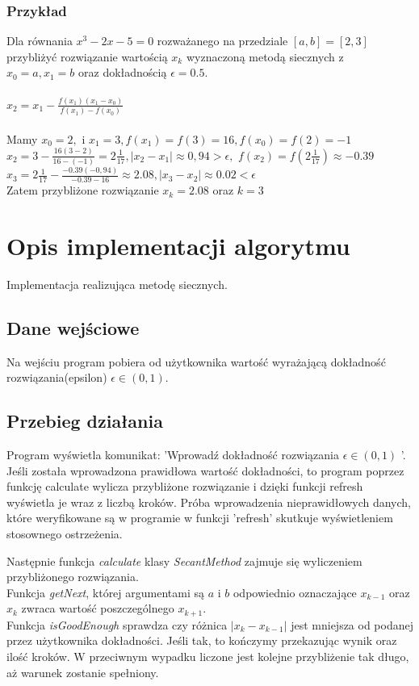 \documentclass[12pt]{article}
\begin{document}
\subsubsection{Przykład}
Dla równania $x^3-2x-5=0$ rozważanego na przedziale $[a,b]=[2,3]$ przybliżyć rozwiązanie wartością $x_k$ wyznaczoną metodą siecznych z\\
$x_0=a, x_1=b$ oraz dokładnością $\epsilon = 0.5.$
\\ \\
$ x_2=x_1 - \frac{f(x_1)(x_1-x_{0})}{f(x_1)-f(x_{0})}$
\\ \\
 Mamy $ x_{0}=2,$ i $x_{1}=3, f(x_1)=f(3)=16, f(x_0)=f(2)=-1$ 
\\$x_2=3-\frac{16(3-2)}{16-(-1)}=2 \frac{1}{17}, |x_2 - x_1|\approx 0,94 > \epsilon,$
$f(x_2)=f(2 \frac{1}{17})\approx-0.39$ $x_3=2 \frac{1}{17}-\frac{-0.39(-0,94)}{-0.39-16}\approx2.08, |x_3 - x_2|\approx 0.02<\epsilon$
\\Zatem przybliżone rozwiązanie $x_k=2.08$ oraz $k=3$
\section{Opis implementacji algorytmu}
Implementacja realizująca metodę siecznych.
\subsection{Dane wejściowe}
Na wejściu program pobiera od użytkownika wartość wyrażającą dokładność rozwiązania(epsilon) $\epsilon \in(0,1).$ 



\subsection{Przebieg działania}
Program wyświetla komunikat: 'Wprowadź dokładność rozwiązania $\epsilon \in(0,1)$ '. Jeśli została wprowadzona prawidłowa wartość dokładności, to program poprzez funkcję calculate wylicza przybliżone rozwiązanie i dzięki funkcji refresh wyświetla je wraz z liczbą kroków.
Próba wprowadzenia nieprawidłowych danych, które weryfikowane są w programie w funkcji 'refresh' skutkuje wyświetleniem stosownego ostrzeżenia.
\par Następnie funkcja \emph{calculate} klasy \emph{SecantMethod} zajmuje się wyliczeniem przybliżonego rozwiązania.\\
Funkcja \emph{getNext}, której argumentami są $a$ i $b$ odpowiednio oznaczające $x_{k-1}$ oraz $x_{k}$ zwraca wartość poszczególnego $x_{k+1}$.
\\
Funkcja \emph{isGoodEnough} sprawdza czy różnica  $|x_k - x_{k-1}|$ jest mniejsza od podanej przez użytkownika dokładności. Jeśli tak, to kończymy przekazując wynik oraz ilość kroków. W przeciwnym wypadku liczone jest kolejne przybliżenie tak długo, aż warunek zostanie spełniony.
\end{document}
